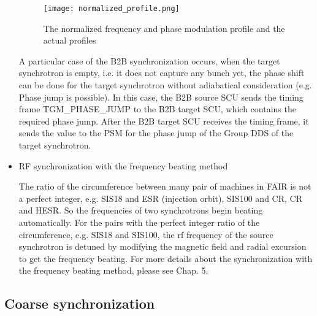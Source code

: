 \begin{itemize}
\begin{figure}[!htb]
   \centering   
   \texttt{[image: normalized\_profile.png]}
   \caption{The normalized frequency and phase modulation profile and the actual profiles}
   \label{normalized_profile}
\end{figure}  

A particular case of the B2B synchronization occurs, when the target synchrotron is empty, i.e. it does not capture any bunch yet, the phase shift can be done for the target synchrotron without adiabatical consideration (e.g. Phase jump is possible). In this case, the B2B source SCU sends the timing frame TGM\_PHASE\_JUMP to the B2B target SCU, which contains the required phase jump. After the B2B target SCU receives the timing frame, it sends the value to the PSM for the phase jump of the Group DDS of the target synchrotron. 

\item RF synchronization with the frequency beating method

The ratio of the circumference between many pair of machines in FAIR is not a perfect integer, e.g. SIS18 and ESR (injection orbit), SIS100 and CR, CR and HESR. So the frequencies of two synchrotrons begin beating automatically. For the pairs with the perfect integer ratio of the circumference, e.g. SIS18 and SIS100, the rf frequency of the source synchrotron is detuned by modifying the magnetic field and radial excursion to get the frequency beating. For more details about the synchronization with the frequency beating method, please see Chap. 5.

\end{itemize}


\subsection{Coarse synchronization}

